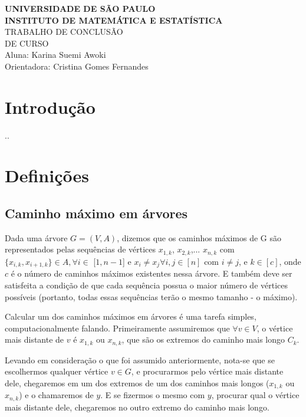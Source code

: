 \documentclass[a4paper,12pt]{article}
\begin{document}
\begin{center}
   {\large \textbf{UNIVERSIDADE DE SÃO PAULO}} \\[1.4cm]
   
   {\large \textbf{INSTITUTO DE MATEMÁTICA E ESTATÍSTICA}}\\[4.2cm]
   
   {\Huge TRABALHO DE CONCLUSÃO }\\[0.3cm]
   {\Huge DE CURSO }\\[9cm]
   
   {\large { Aluna: Karina Suemi Awoki}}\\[0.3cm]
   
   {\large { Orientadora: Cristina Gomes Fernandes}}
   

\end{center}

\newpage
\section{Introdução}
..
\bigskip

\section{Definições}
    
    \subsection{Caminho máximo em árvores}

        Dada uma árvore $G = (V,A)$, dizemos que os caminhos máximos de G são representados 
        pelas sequências de vértices $x_{1, k}$, $x_{2, k}$,... $x_{n, k}$ com 
        $\{x_{i, k}, x_{i+1, k}\} \in A, \forall i \in$ [$1, n-1$]
        e $x_i\neq x_j  \forall i, j \in [n]$ com $i \neq j$, e $k \in [c]$, 
        onde $c$ é o número de caminhos máximos existentes nessa árvore.
        E também deve ser satisfeita a condição de que cada sequência possua o maior número 
        de vértices possíveis 
        (portanto, todas essas sequências terão o mesmo tamanho - o máximo).

        \bigskip

        Calcular um dos caminhos máximos em árvores é uma tarefa simples, computacionalmente
        falando. Primeiramente assumiremos que $\forall v \in V$, o vértice mais distante
        de $v$ é $x_{1, k}$ ou $x_{n, k}$, que são os extremos do caminho mais longo $C_k$.

        Levando em consideração o que foi assumido anteriormente, nota-se que se escolhermos 
        qualquer vértice $v \in G$, e procurarmos pelo vértice mais
        distante dele, chegaremos em um dos extremos de um dos caminhos mais longos ($x_{1, k}$ 
        ou $x_{n, k}$) e o chamaremos de $y$.
        E se fizermos o mesmo com $y$, procurar qual o vértice mais distante dele, chegaremos no
        outro extremo do caminho mais longo.
        
\end{document}
